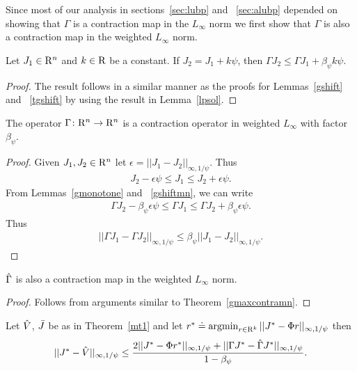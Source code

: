 Since most of our analysis in sections~\ref{sec:lubp} and ~\ref{sec:alubp} depended on showing that $\Gamma$ is a contraction map in the $L_\infty$ norm we first show that $\Gamma$ is also a contraction map in the weighted $L_\infty$ norm.
\begin{lemma}\label{gshiftmn}
Let $J_1\in \mathrm{R}^n$ and $k\in \mathrm{R}$ be a constant. If $J_2=J_1+k\psi$, then $\Gamma J_2\leq \Gamma J_1+\beta_{\psi} k\psi$.
\end{lemma}
\begin{proof}
The result follows in a similar manner as the proofs for Lemmas~\ref{gshift} and ~\ref{tgshift} by using the result in Lemma~\ref{lpsol}.
\end{proof}
\begin{theorem}\label{gmaxcontramn}
The operator $\Gamma  \colon \mathrm{R}^n\rightarrow \mathrm{R}^n$ is a contraction operator in weighted $L_\infty$ with factor $\beta_{\psi}$.
\end{theorem}
\begin{proof}
Given $J_1,J_2\in \mathrm{R}^n$ let $\epsilon=||J_1-J_2||_{\infty,1/\psi}$. Thus
\begin{align}\label{ineq}
J_2-\epsilon\psi\leq J_1\leq J_2+\epsilon \psi.
\end{align}
From Lemmas~\ref{gmonotone} and ~\ref{gshiftmn}, we can write
\begin{align}\label{ineq}
\Gamma J_2-\beta_{\psi} \epsilon\psi\leq \Gamma J_1\leq \Gamma J_2+\beta_{\psi} \epsilon\psi.
\end{align}
Thus
\begin{align}
||\Gamma J_1-\Gamma J_2||_{\infty,1/\psi}\leq \beta_{\psi} ||J_1-J_2||_{\infty,1/\psi}.
\end{align}
\end{proof}
\begin{corollary}\label{hgmaxcontramn}
$\hat{\Gamma}$ is also a contraction map in the weighted $L_\infty$ norm.
\end{corollary}
\begin{proof}
Follows from arguments similar to Theorem~\ref{gmaxcontramn}.
\end{proof}
\begin{lemma}\label{cmt1mn}
Let $\hat{V}$, $\bar{J}$ be as in Theorem~\ref{mt1} and let $r^*\doteq\operatorname{argmin}_{r\in \mathrm{R}^k}||J^*-\Phi r||_{\infty,1/\psi}$ then
\begin{align}
||J^*-\hat{V}||_{\infty,1/\psi}\leq \frac{2||J^*-\Phi r^*||_{\infty,1/\psi}+||\Gamma J^*-\hat{\Gamma} J^*||_{\infty,1/\psi}}{1-\beta_{\psi}}.
\end{align}
\end{lemma}
